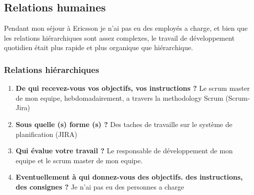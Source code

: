 \documentclass{resume} %
\begin{document}
\subsection{Relations humaines}
	
	
	Pendant mon séjour à Ericsson je n'ai pas eu des employés a charge, et bien que les relations hiérarchiques sont assez complexes, le travail de développement quotidien était plus rapide et plus organique que hiérarchique.

	\subsubsection {Relations hiérarchiques}
		\begin{enumerate}
		\item \textbf{De qui recevez-vous vos objectifs, vos instructions ?}
			Le scrum master de mon equipe, hebdomadairement, a travers la methodology Scrum (Scrum-Jira)
		\item \textbf{Sous quelle (s) forme (s) ?}
			Des taches de travaille sur le système de planification (JIRA) 
		\item \textbf{Qui évalue votre travail ?}
			Le responsable de développement de mon equipe et le scrum master de mon equipe.
		\item  \textbf{Eventuellement à qui donnez-vous des objectifs. des instructions, des consignes ?}
			Je n'ai pas eu des personnes a charge 
		\end{enumerate}
\end{document}
